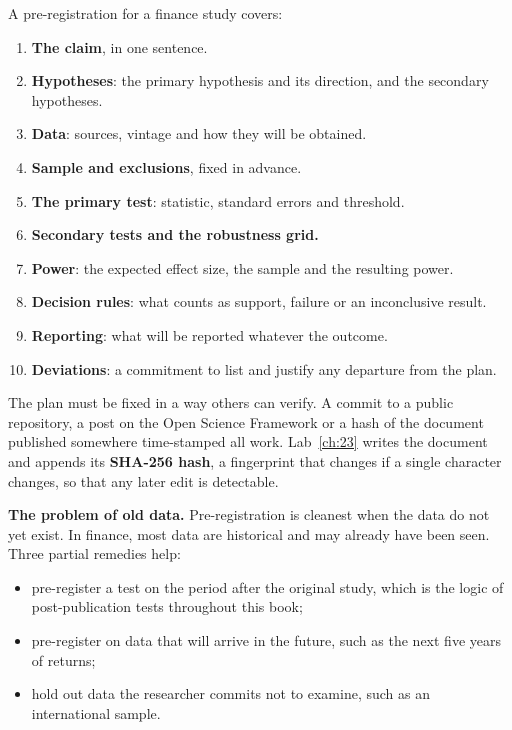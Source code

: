 A pre-registration for a finance study covers:

\begin{enumerate}
  \item \textbf{The claim}, in one sentence.
  \item \textbf{Hypotheses}: the primary hypothesis and its direction, and the secondary hypotheses.
  \item \textbf{Data}: sources, vintage and how they will be obtained.
  \item \textbf{Sample and exclusions}, fixed in advance.
  \item \textbf{The primary test}: statistic, standard errors and threshold.
  \item \textbf{Secondary tests and the robustness grid.}
  \item \textbf{Power}: the expected effect size, the sample and the resulting power.
  \item \textbf{Decision rules}: what counts as support, failure or an inconclusive result.
  \item \textbf{Reporting}: what will be reported whatever the outcome.
  \item \textbf{Deviations}: a commitment to list and justify any departure from the plan.
\end{enumerate}

The plan must be fixed in a way others can verify. A commit to a public repository, a post on the Open Science Framework or a hash of the document published somewhere time-stamped all work. Lab~\ref{ch:23} writes the document and appends its \textbf{SHA-256 hash}, a fingerprint that changes if a single character changes, so that any later edit is detectable.

\textbf{The problem of old data.} Pre-registration is cleanest when the data do not yet exist. In finance, most data are historical and may already have been seen. Three partial remedies help:

\begin{itemize}
  \item pre-register a test on the period after the original study, which is the logic of post-publication tests throughout this book;
  \item pre-register on data that will arrive in the future, such as the next five years of returns;
  \item hold out data the researcher commits not to examine, such as an international sample.
\end{itemize}

